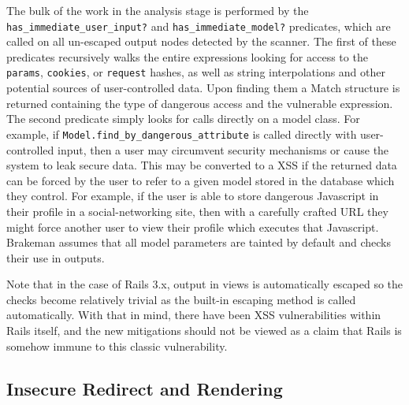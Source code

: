 \documentclass[conference]{IEEEtran}
\begin{document}
The bulk of the work in the analysis stage is performed by the
\texttt{has\_immediate\_user\_input?} and \texttt{has\_immediate\_model?}
predicates, which are called on all un-escaped output nodes detected by the
scanner.  The first of these predicates recursively walks the entire expressions
looking for access to the \texttt{params}, \texttt{cookies}, or \texttt{request}
hashes, as well as string interpolations and other potential sources of
user-controlled data.  Upon finding them a Match structure is returned
containing the type of dangerous access and the vulnerable expression.  The
second predicate simply looks for calls directly on a model class.  For example,
if \texttt{Model.find\_by\_dangerous\_attribute} is called directly with
user-controlled input,  then a user may circumvent security mechanisms or cause
the system to leak secure data.  This may be converted to a XSS if the returned
data can be forced by the user to refer to a given model stored in the database
which they control.  For example, if the user is able to store dangerous
Javascript in their profile in a social-networking site, then with a carefully
crafted URL they might force another user to view their profile which executes
that Javascript.  Brakeman assumes that all model parameters are tainted by
default and checks their use in outputs.

Note that in the case of Rails 3.x, output in views is automatically escaped so
the checks become relatively trivial as the built-in escaping method is called
automatically.  With that in mind, there have been XSS vulnerabilities within
Rails itself, and the new mitigations should not be viewed as a claim that Rails
is somehow immune to this classic vulnerability.

\subsection{Insecure Redirect and Rendering}
\end{document}
